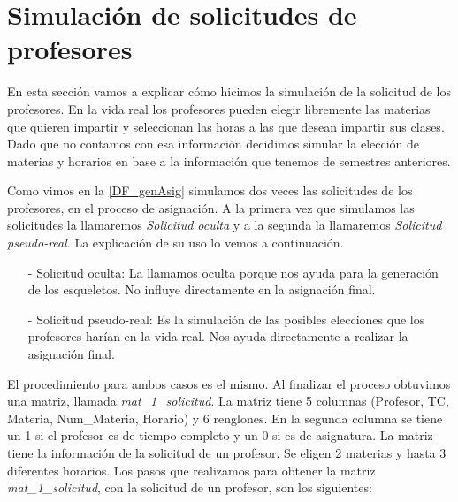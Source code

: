\section{Simulación de solicitudes de profesores} \label{SimSolicitudesProfesores}

En esta sección vamos a explicar cómo hicimos la simulación de la solicitud de los profesores. En la vida real los profesores pueden elegir libremente las materias que quieren impartir y seleccionan las horas a las que desean impartir sus clases. Dado que no contamos con esa información decidimos simular la elección de materias y horarios en base a la información que tenemos de semestres anteriores.

Como vimos en la \figurename{\ref{DF_genAsig}} simulamos dos veces las solicitudes de los profesores, en el proceso de asignación. A la primera vez que simulamos las solicitudes la llamaremos \textit{Solicitud oculta} y a la segunda la llamaremos \textit{Solicitud pseudo-real}. La explicación de su uso lo vemos a continuación.

\begin{itemize}
\item[-] Solicitud oculta: La llamamos oculta porque nos ayuda para la generación de los esqueletos. No influye directamente en la asignación final.

\item[-] Solicitud pseudo-real: Es la simulación de las posibles elecciones que los profesores harían en la vida real. Nos ayuda directamente a realizar la asignación final.
\end{itemize}

El procedimiento para ambos casos es el mismo. Al finalizar el proceso obtuvimos una matriz, llamada \textit{mat\_1\_solicitud}. La matriz tiene 5 columnas (Profesor, TC, Materia, Num\_Materia, Horario) y 6 renglones. En la segunda columna se tiene un 1 si el profesor es de tiempo completo y un 0 si es de asignatura. La matriz tiene la información de la solicitud de un profesor. Se eligen 2 materias y hasta 3 diferentes horarios.  Los pasos que realizamos para obtener la matriz \textit{mat\_1\_solicitud}, con la solicitud de un profesor, son los siguientes:

